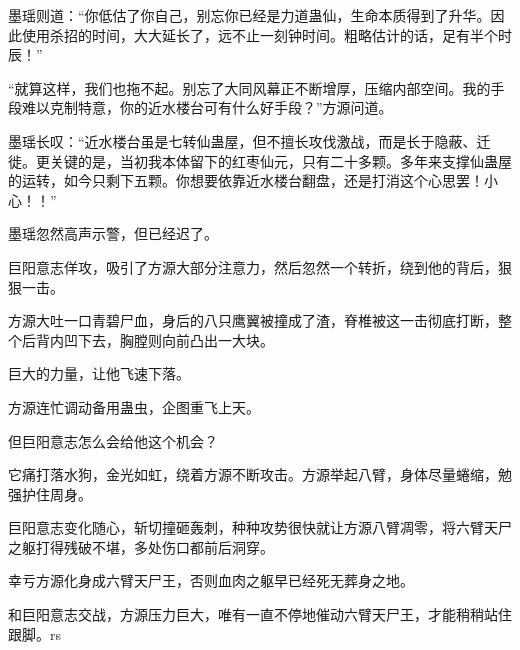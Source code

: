 \begin{this_body}
墨瑶则道：“你低估了你自己，别忘你已经是力道蛊仙，生命本质得到了升华。因此使用杀招的时间，大大延长了，远不止一刻钟时间。粗略估计的话，足有半个时辰！”

“就算这样，我们也拖不起。别忘了大同风幕正不断增厚，压缩内部空间。我的手段难以克制特意，你的近水楼台可有什么好手段？”方源问道。

墨瑶长叹：“近水楼台虽是七转仙蛊屋，但不擅长攻伐激战，而是长于隐蔽、迁徙。更关键的是，当初我本体留下的红枣仙元，只有二十多颗。多年来支撑仙蛊屋的运转，如今只剩下五颗。你想要依靠近水楼台翻盘，还是打消这个心思罢！小心！！”

墨瑶忽然高声示警，但已经迟了。

巨阳意志佯攻，吸引了方源大部分注意力，然后忽然一个转折，绕到他的背后，狠狠一击。

方源大吐一口青碧尸血，身后的八只鹰翼被撞成了渣，脊椎被这一击彻底打断，整个后背内凹下去，胸膛则向前凸出一大块。

巨大的力量，让他飞速下落。

方源连忙调动备用蛊虫，企图重飞上天。

但巨阳意志怎么会给他这个机会？

它痛打落水狗，金光如虹，绕着方源不断攻击。方源举起八臂，身体尽量蜷缩，勉强护住周身。

巨阳意志变化随心，斩切撞砸轰刺，种种攻势很快就让方源八臂凋零，将六臂天尸之躯打得残破不堪，多处伤口都前后洞穿。

幸亏方源化身成六臂天尸王，否则血肉之躯早已经死无葬身之地。

和巨阳意志交战，方源压力巨大，唯有一直不停地催动六臂天尸王，才能稍稍站住跟脚。rs

\end{this_body}

